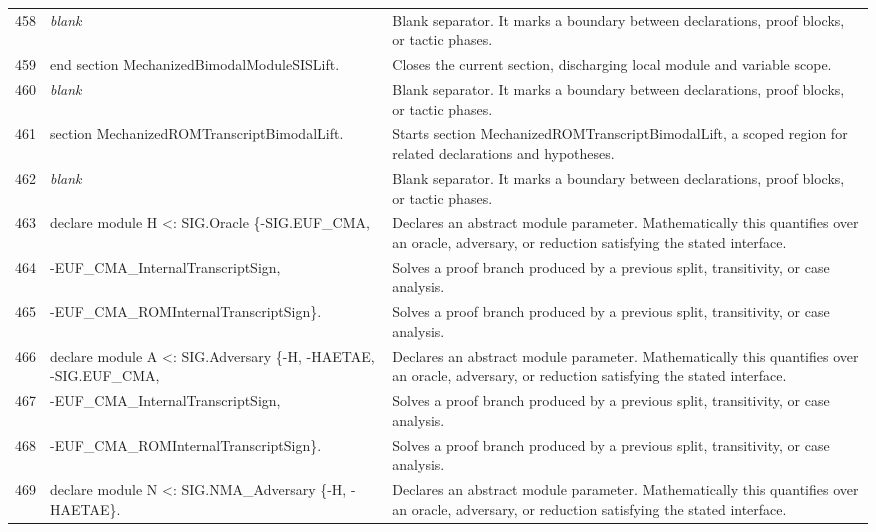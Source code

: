 \documentclass[10pt]{article}
\begin{document}
\begin{longtable}{r L{0.53\textwidth} L{0.37\textwidth}}
458 & {\ttfamily\scriptsize \emph{blank}} & Blank separator.  It marks a boundary between declarations, proof blocks, or tactic phases. \\
459 & {\ttfamily\scriptsize end section MechanizedBimodalModuleSISLift.} & Closes the current section, discharging local module and variable scope. \\
460 & {\ttfamily\scriptsize \emph{blank}} & Blank separator.  It marks a boundary between declarations, proof blocks, or tactic phases. \\
461 & {\ttfamily\scriptsize section MechanizedROMTranscriptBimodalLift.} & Starts section MechanizedROMTranscriptBimodalLift, a scoped region for related declarations and hypotheses. \\
462 & {\ttfamily\scriptsize \emph{blank}} & Blank separator.  It marks a boundary between declarations, proof blocks, or tactic phases. \\
463 & {\ttfamily\scriptsize declare module H <: SIG.Oracle \{-SIG.EUF\_CMA,} & Declares an abstract module parameter.  Mathematically this quantifies over an oracle, adversary, or reduction satisfying the stated interface. \\
464 & {\ttfamily\scriptsize                                  -EUF\_CMA\_InternalTranscriptSign,} & Solves a proof branch produced by a previous split, transitivity, or case analysis. \\
465 & {\ttfamily\scriptsize                                  -EUF\_CMA\_ROMInternalTranscriptSign\}.} & Solves a proof branch produced by a previous split, transitivity, or case analysis. \\
466 & {\ttfamily\scriptsize declare module A <: SIG.Adversary \{-H, -HAETAE, -SIG.EUF\_CMA,} & Declares an abstract module parameter.  Mathematically this quantifies over an oracle, adversary, or reduction satisfying the stated interface. \\
467 & {\ttfamily\scriptsize                                     -EUF\_CMA\_InternalTranscriptSign,} & Solves a proof branch produced by a previous split, transitivity, or case analysis. \\
468 & {\ttfamily\scriptsize                                     -EUF\_CMA\_ROMInternalTranscriptSign\}.} & Solves a proof branch produced by a previous split, transitivity, or case analysis. \\
469 & {\ttfamily\scriptsize declare module N <: SIG.NMA\_Adversary \{-H, -HAETAE\}.} & Declares an abstract module parameter.  Mathematically this quantifies over an oracle, adversary, or reduction satisfying the stated interface. \\

\end{longtable}
\end{document}
